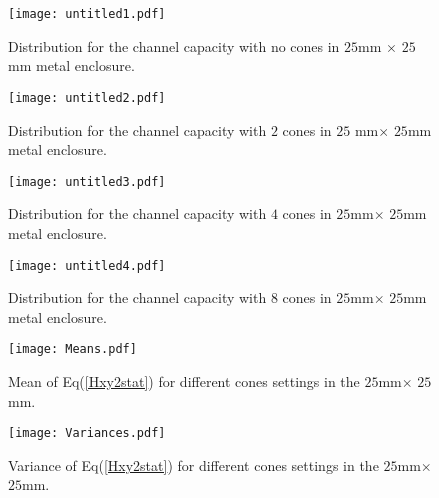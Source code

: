 \documentclass[10pt, final, journal, letterpaper, oneside, twocolumn]{IEEEtran}
\begin{document}
\begin{figure}
        \centering
        \texttt{[image: untitled1.pdf]}
        \caption{Distribution for the channel capacity with no cones in $25$mm $\times$ $25$ mm metal enclosure.}
        \label{fig:pdf_channel1}
        \end{figure}
        \begin{figure}
          \centering
        \texttt{[image: untitled2.pdf]}
        \caption{Distribution for the channel capacity with $2$ cones in $25$ mm$\times$ $25$mm metal enclosure.}
        \label{fig:pdf_channel2}
        \end{figure}
        \begin{figure}
          \centering
        \texttt{[image: untitled3.pdf]}
        \caption{Distribution for the channel capacity with $4$ cones in $25$mm$\times$ $25$mm metal enclosure.}
        \label{fig:pdf_channel3}
        \end{figure}
        \begin{figure}
          \centering
        \texttt{[image: untitled4.pdf]}
        \caption{Distribution for the channel capacity with $8$ cones in $25$mm$\times$ $25$mm metal enclosure.}
        \label{fig:pdf_channel4}
    \end{figure}


 \begin{figure}
        \centering
        \texttt{[image: Means.pdf]}
        \caption{Mean of Eq(\ref{Hxy2stat})  for different cones settings in the $25$mm$\times$ $25$mm.}
        \label{fig:mean_channel1}
        \end{figure}

 \begin{figure}
        \centering
        \texttt{[image: Variances.pdf]}
        \caption{Variance of Eq(\ref{Hxy2stat})  for different cones settings in the $25$mm$\times$ $25$mm.}
        \label{fig:var_channel1}
        \end{figure}
\end{document}
